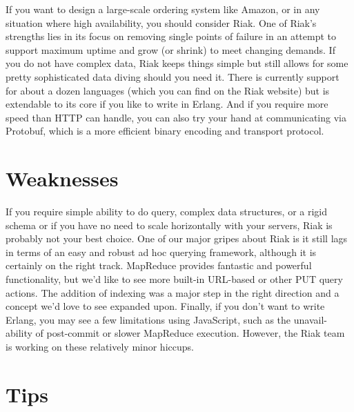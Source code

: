If you want to design a large-scale ordering system like Amazon, or in any situation where high availability, you should consider Riak. One of Riak's strengths lies in its focus on removing single points of failure in an attempt to support maximum uptime and grow (or shrink) to meet changing demands. If you do not have complex data, Riak keeps things simple but still allows for some pretty sophisticated data diving should you need it. There is currently support for about a dozen languages (which you can find on the Riak website) but is extendable to its core if you like to write in Erlang. And if you require more speed than HTTP can handle, you can also try your hand at communicating via Protobuf, which is a more efficient binary encoding and transport protocol.\cite{seven_databases}

\section{Weaknesses}

If you require simple ability to do query, complex data structures, or a rigid schema or if you have no need to scale horizontally with your servers, Riak is probably not your best choice. One of our major gripes about Riak is it still lags in terms of an easy and robust ad hoc querying framework, although it is certainly on the right track. MapReduce provides fantastic and powerful functionality, but we’d like to see more built-in URL-based or other PUT query actions. The addition of indexing was a major step in the right direction and a concept we’d love to see expanded upon. Finally, if you don’t want to write Erlang, you may see a few limitations using JavaScript, such as the unavail- ability of post-commit or slower MapReduce execution. However, the Riak team is working on these relatively minor hiccups.\cite{seven_databases}

\section{Tips}

